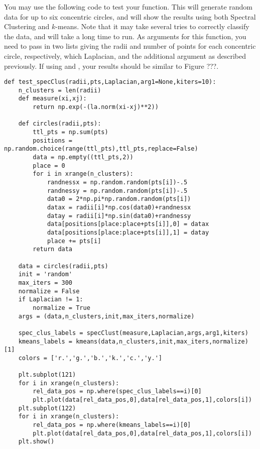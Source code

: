 You may use the following code to test your function.  This will generate random data for up to six concentric circles, and will show the results using both Spectral Clustering and $k$-means.  Note that it may take several tries to correctly classify the data, and will take a long time to run.  As arguments for this function, you need to pass in two lists giving the radii and number of points for each concentric circle, respectively, which Laplacian, and the additional argument  as described previously. If using  and ,  your results should be similar to Figure ???.
\begin{lstlisting}
def test_specClus(radii,pts,Laplacian,arg1=None,kiters=10):
    n_clusters = len(radii)
    def measure(xi,xj):
        return np.exp(-(la.norm(xi-xj)**2))
    
    def circles(radii,pts):
        ttl_pts = np.sum(pts)
        positions = np.random.choice(range(ttl_pts),ttl_pts,replace=False)
        data = np.empty((ttl_pts,2))
        place = 0
        for i in xrange(n_clusters):
            randnessx = np.random.random(pts[i])-.5
            randnessy = np.random.random(pts[i])-.5
            data0 = 2*np.pi*np.random.random(pts[i])
            datax = radii[i]*np.cos(data0)+randnessx
            datay = radii[i]*np.sin(data0)+randnessy
            data[positions[place:place+pts[i]],0] = datax
            data[positions[place:place+pts[i]],1] = datay
            place += pts[i]
        return data
    
    data = circles(radii,pts)    
    init = 'random'
    max_iters = 300
    normalize = False
    if Laplacian != 1:
        normalize = True
    args = (data,n_clusters,init,max_iters,normalize)
    
    spec_clus_labels = specClust(measure,Laplacian,args,arg1,kiters)
    kmeans_labels = kmeans(data,n_clusters,init,max_iters,normalize)[1]
    colors = ['r.','g.','b.','k.','c.','y.']
    
    plt.subplot(121)
    for i in xrange(n_clusters):
        rel_data_pos = np.where(spec_clus_labels==i)[0]
        plt.plot(data[rel_data_pos,0],data[rel_data_pos,1],colors[i])
    plt.subplot(122)
    for i in xrange(n_clusters):
        rel_data_pos = np.where(kmeans_labels==i)[0]
        plt.plot(data[rel_data_pos,0],data[rel_data_pos,1],colors[i])
    plt.show()
\end{lstlisting}

